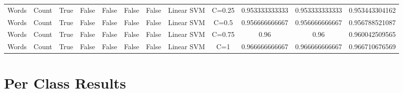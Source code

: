 \documentclass{article}
\begin{document}
\begin{tabular}{|c|c|c|c|c|c|c|c|c|c|c|c|}
Words & Count & True & False & False & False & False & Linear SVM & C=0.25 & 0.953333333333 & 0.953333333333 & 0.953443304162 \\ 
Words & Count & True & False & False & False & False & Linear SVM & C=0.5 & 0.956666666667 & 0.956666666667 & 0.956788521087 \\ 
Words & Count & True & False & False & False & False & Linear SVM & C=0.75 & 0.96 & 0.96 & 0.960042509565 \\ 
Words & Count & True & False & False & False & False & Linear SVM & C=1 & 0.966666666667 & 0.966666666667 & 0.966710676569 \\ 
\hline
  \end{tabular}
  
  \clearpage
  \section{Per Class Results}
    
\end{document}
